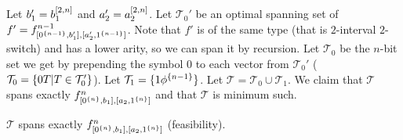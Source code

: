 Let $b_1' = b_1^{[2, n]}$
and $a_2' = a_2^{[2, n]}$.
Let $\mathcal{T}_0'$ be an optimal spanning set of
$f' = f^{n-1}_{[0^{\{n-1\}}, b_1'], [a_2', 1^{\{n-1\}}]}$.
Note that $f'$ is of the same type
(that is $2$-interval $2$-switch)
and has a lower arity,
so we can span it by recursion.
Let $\mathcal{T}_0$ be the $n$-bit set we get
by prepending the symbol $0$
to each vector from $\mathcal{T}_0'$
($\mathcal{T}_0 = \{0 T | T \in \mathcal{T}_0'\}$).
Let $\mathcal{T}_1 = \{1 \phi^{\{n-1\}}\}$.
Let $\mathcal{T} = \mathcal{T}_0 \cup \mathcal{T}_1$.
We claim that $\mathcal{T}$ spans exactly
$f^{n}_{[0^{\{n\}}, b_1], [a_2, 1^{\{n\}}]}$
and that $\mathcal{T}$ is minimum such.

\begin{theorem}
$\mathcal{T}$ spans exactly
$f^{n}_{[0^{\{n\}}, b_1], [a_2, 1^{\{n\}}]}$ (feasibility).
\end{theorem}


